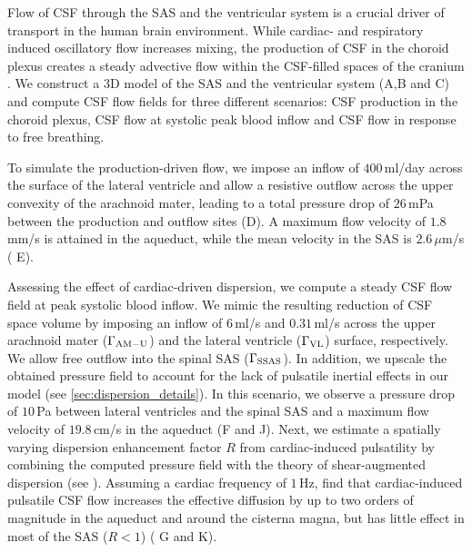 \documentclass[fleqn,10pt]{wlscirep}
\begin{document}
Flow of CSF through the SAS and the ventricular system is a crucial driver of transport in the human brain environment.
While cardiac- and respiratory induced oscillatory flow increases mixing, the production of CSF in the choroid plexus creates a steady advective flow within the CSF-filled spaces of the cranium \cite{hornkjol2022csf}. 
We construct a 3D model of the SAS and the ventricular system (A,B and C) and compute CSF flow fields for three different scenarios: CSF production in the choroid plexus, CSF flow at systolic peak blood inflow and CSF flow in response to free breathing.

To simulate the production-driven flow, we impose an inflow of $400\,$ml/day \cite{nilsson1992circadian} across the surface of the lateral ventricle and allow a resistive outflow across the upper convexity of the arachnoid mater, leading to a total pressure drop of $26\,$mPa between the production and outflow sites (D). A maximum flow velocity of $1.8\,$mm/s is attained in the aqueduct, while the mean velocity in the SAS is $2.6\,\mu$m/s ( E).


Assessing the effect of cardiac-driven dispersion, we compute a steady CSF flow field at peak systolic blood inflow. We mimic the resulting reduction of CSF space volume by imposing an inflow of $6\,$ml/s \cite{baledent2014imaging, causemann2022human} and $0.31\,$ml/s \cite{vinje2019respiratory} across the upper arachnoid mater ($\Gamma_{\rm AM-U}$) and the lateral ventricle ($\Gamma_{\rm VL}$) surface, respectively. We allow free outflow into the spinal SAS ($\Gamma_{\rm SSAS}$). In addition, we upscale the obtained pressure field to account for the lack of pulsatile inertial effects in our model (see \ref{sec:dispersion_details}). In this scenario, we observe a pressure drop of $10\,$Pa between lateral ventricles and the spinal SAS and a maximum flow velocity of $19.8\,$cm/s in the aqueduct (F and J).
Next, we estimate a spatially varying dispersion enhancement factor $R$ from cardiac-induced pulsatility by combining the computed pressure field with the theory of shear-augmented dispersion (see ). Assuming a cardiac frequency of $1\,$Hz, find that cardiac-induced pulsatile CSF flow increases the effective diffusion by up to two orders of magnitude in the aqueduct and around the cisterna magna, but has little effect in most of the SAS ($R < 1$) ( G and K). 
\end{document}
